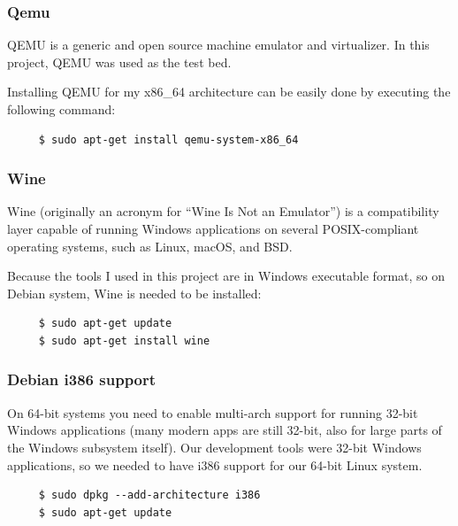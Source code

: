 \documentclass{swfcthesis}
\begin{document}
\subsubsection{Qemu}

QEMU is a generic and open source machine emulator and virtualizer\cite{wiki:qemu}. In
this project, QEMU was used as the test bed.

Installing QEMU for my x86\_64 architecture can be easily done by executing the following
command:
\begin{verbatim}
     $ sudo apt-get install qemu-system-x86_64
\end{verbatim}

\subsubsection{Wine}

Wine (originally an acronym for ``Wine Is Not an Emulator'') is a compatibility layer
capable of running Windows applications on several POSIX-compliant operating systems, such
as Linux, macOS, and BSD\cite{wiki:wine}.

Because the tools I used in this project are in Windows executable format, so on Debian system,
Wine is needed to be installed:

\begin{verbatim}
     $ sudo apt-get update
     $ sudo apt-get install wine
\end{verbatim}

\subsubsection{Debian i386 support}

On 64-bit systems you need to enable multi-arch support for running 32-bit Windows
applications (many modern apps are still 32-bit, also for large parts of the Windows
subsystem itself). Our development tools were 32-bit Windows applications, so we needed to
have i386 support for our 64-bit Linux system.

\begin{verbatim}
     $ sudo dpkg --add-architecture i386
     $ sudo apt-get update
\end{verbatim}

\iffalse %
\end{document}

